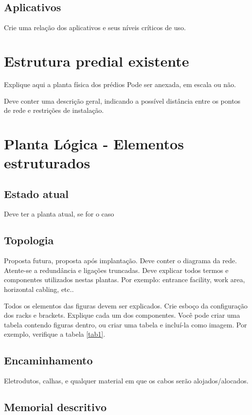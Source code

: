 \documentclass[	DIV=calc,%
paper=a4,%
fontsize=12pt,%
onecolumn]{scrartcl}	 					%
\begin{document}
	\subsection{Aplicativos}
	Crie uma relação dos aplicativos e seus níveis críticos de uso.
	
	
	\section{Estrutura predial existente}
	
	Explique aqui a planta física dos prédios
	Pode ser anexada, em escala ou não.
	
	Deve conter uma descrição geral, indicando a possível distância entre os pontos de rede e restrições de instalação.
	
	\section{Planta Lógica - Elementos estruturados}
	
	\subsection{Estado atual}
	Deve ter a planta atual, se for o caso
	
	\subsection{Topologia}
	Proposta futura, proposta após implantação.
	Deve conter o diagrama da rede. Atente-se a redundância  e ligações truncadas.
	Deve explicar todos termos e componentes utilizados nestas plantas. Por exemplo: entrance facility, work area, horizontal cabling, etc..
	
	Todos os elementos das figuras devem ser explicados. 
	Crie esboço da configuração dos racks e brackets. Explique cada um dos componentes. Você pode criar uma tabela contendo figuras dentro, ou criar uma tabela e incluí-la como imagem. Por exemplo, verifique a tabela \ref{tab1}.
	
	
	
	\subsection{Encaminhamento}
	Eletrodutos, calhas, e qualquer material em que os cabos serão alojados/alocados.
	
	\subsection{Memorial descritivo}
	
\end{document}
